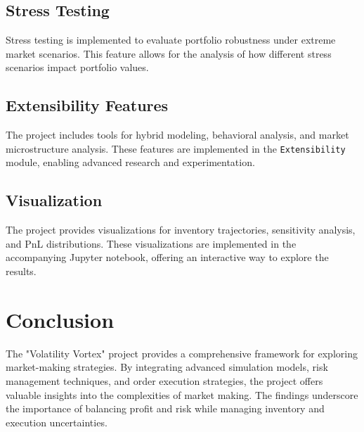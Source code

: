 \documentclass{beamer}
\begin{document}
\subsection{Stress Testing}
Stress testing is implemented to evaluate portfolio robustness under extreme market scenarios. This feature allows for the analysis of how different stress scenarios impact portfolio values.

\subsection{Extensibility Features}
The project includes tools for hybrid modeling, behavioral analysis, and market microstructure analysis. These features are implemented in the \texttt{Extensibility} module, enabling advanced research and experimentation.

\subsection{Visualization}
The project provides visualizations for inventory trajectories, sensitivity analysis, and PnL distributions. These visualizations are implemented in the accompanying Jupyter notebook, offering an interactive way to explore the results.

\section{Conclusion}
The "Volatility Vortex" project provides a comprehensive framework for exploring market-making strategies. By integrating advanced simulation models, risk management techniques, and order execution strategies, the project offers valuable insights into the complexities of market making. The findings underscore the importance of balancing profit and risk while managing inventory and execution uncertainties.
\end{document}
